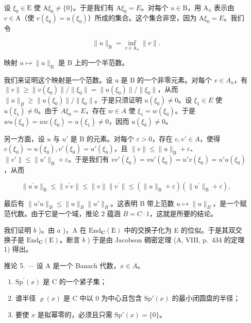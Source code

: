 设 \(\xi_0\in \mathrm{E}\) 使 \(\mathrm{A}\xi_0\neq\{0\}\)。于是我们有 \(\mathrm{A}\xi_0 = E\)。对每个 \(u\in \mathrm{B}\)，用 \(\mathrm{A}_u\) 表示由 \(v\in \mathrm{A}\)（使 \(v(\xi_0) = u(\xi_0)\)）所成的集合。这个集合非空，因为 \(\mathrm{A}\xi_0 = E\)。我们令

\[
\| u \| _ {\mathrm{B}} = \inf _ {v \in \mathrm{A} _ {u}} \| v \|.
\]

映射 \(u \mapsto \|u\|_{\mathrm{B}}\) 是 B 上的一个半范数。

我们来证明这个映射是一个范数。设 u 是 B 的一个非零元素。对每个 \(v \in A_{u}\)，有 \(\|v\| \geqslant \|v(\xi_{0})\|/\|\xi_{0}\| = \|u(\xi_{0})\|/\|\xi_{0}\|\)，从而 \(\|u\|_{B} \geqslant \|u(\xi_{0})\|/\|\xi_{0}\|\)。于是只须证明 \(u(\xi_{0}) \neq 0\)。设 \(\xi_{1} \in E\) 使 \(u(\xi_{1}) \neq 0\)。由于 \(A\xi_{0} = E\)，存在 \(w \in A\) 使 \(\xi_{1} = w(\xi_{0})\)。于是 \(wu(\xi_{0}) = uw(\xi_{0}) = u(\xi_{1}) \neq 0\)，因而 \(u(\xi_{0}) \neq 0\)。

另一方面，设 \(u\) 与 \(u'\) 是 B 的元素。对每个 \(\varepsilon > 0\)，存在 \(v, v' \in A\)，使得 \(v(\xi_0) = u(\xi_0), v'(\xi_0) = u'(\xi_0)\)，且 \(\|v\| \leqslant \|u\|_{\mathrm{B}} + \varepsilon\)、\(\|v'\| \leqslant \|u'\|_{\mathrm{B}} + \varepsilon\)。于是我们有 \(vv'(\xi_0) = vu'(\xi_0) = u'v(\xi_0) = u'u(\xi_0)\)，从而

\[
\| u ^ {\prime} u \| _ {\mathrm{B}} \leqslant \| v ^ {\prime} v \| \leqslant \| v \| \| v ^ {\prime} \| \leqslant (\| u \| _ {\mathrm{B}} + \varepsilon) (\| u ^ {\prime} \| _ {\mathrm{B}} + \varepsilon),
\]

最后有 \(\|u'u\|_{B} \leqslant \|u\|_{B} \|u'\|_{B}\)。这表明 B 带上范数 \(u \mapsto \|u\|_{B}\)，是一个赋范代数。由于它是一个域，推论 2 蕴涵 \(B = C \cdot 1\)，这就是所要的结论。

我们证明 \(b\) )。由 \(a\) )，A 在 \(\mathrm{End}_{\mathbf{C}}(\mathrm{E})\) 中的交换子化为 E 的位似。于是其双交换子是 \(\mathrm{End}_{\mathbf{C}}(\mathrm{E})\)。断言 \(b\) ) 于是由 Jacobson 稠密定理 (A, VIII, p.~434 的定理 1) 得出。

推论 5. --- 设 A 是一个 Banach 代数，\(x \in A\)。

\begin{enumerate}
\def\labelenumi{\alph{enumi})}
\item
  \(\mathrm{Sp}^{\prime}(x)\) 是 C 的一个紧子集；
\item
  谱半径 \(\varrho(x)\) 是 C 中以 0 为中心且包含 \(\mathrm{Sp}'(x)\) 的最小闭圆盘的半径；
\item
  要使 \(x\) 是拟幂零的，必须且只需 \(\mathrm{Sp}'(x) = \{0\}\)。
\end{enumerate}

